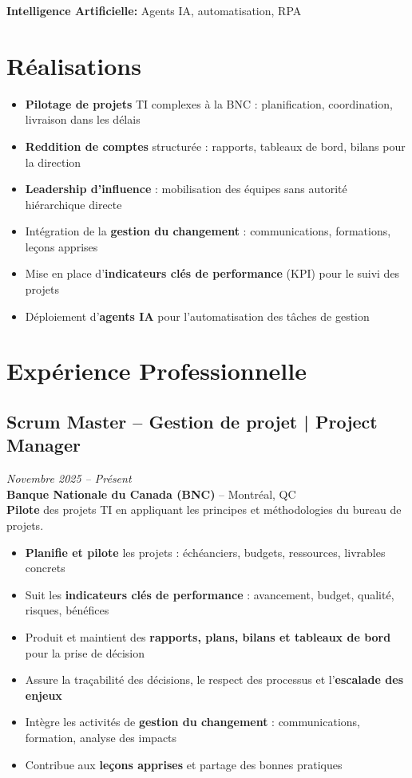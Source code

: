 \documentclass[11pt,a4paper]{article}
\begin{document}
\textbf{Intelligence Artificielle:} Agents IA, automatisation, RPA

\vspace{6pt}

\section*{Réalisations}
\begin{itemize}
    \item \textbf{Pilotage de projets} TI complexes à la BNC : planification, coordination, livraison dans les délais
    \item \textbf{Reddition de comptes} structurée : rapports, tableaux de bord, bilans pour la direction
    \item \textbf{Leadership d'influence} : mobilisation des équipes sans autorité hiérarchique directe
    \item Intégration de la \textbf{gestion du changement} : communications, formations, leçons apprises
    \item Mise en place d'\textbf{indicateurs clés de performance} (KPI) pour le suivi des projets
    \item Déploiement d'\textbf{agents IA} pour l'automatisation des tâches de gestion
\end{itemize}

\section*{Expérience Professionnelle}

\subsection*{Scrum Master -- Gestion de projet | Project Manager} \hfill \textit{Novembre 2025 -- Présent}\\
\textbf{Banque Nationale du Canada (BNC)} -- Montréal, QC\\
\textbf{Pilote} des projets TI en appliquant les principes et méthodologies du bureau de projets.
\begin{itemize}
    \item \textbf{Planifie et pilote} les projets : échéanciers, budgets, ressources, livrables concrets
    \item Suit les \textbf{indicateurs clés de performance} : avancement, budget, qualité, risques, bénéfices
    \item Produit et maintient des \textbf{rapports, plans, bilans et tableaux de bord} pour la prise de décision
    \item Assure la traçabilité des décisions, le respect des processus et l'\textbf{escalade des enjeux}
    \item Intègre les activités de \textbf{gestion du changement} : communications, formation, analyse des impacts
    \item Contribue aux \textbf{leçons apprises} et partage des bonnes pratiques
\end{itemize}
\end{document}
